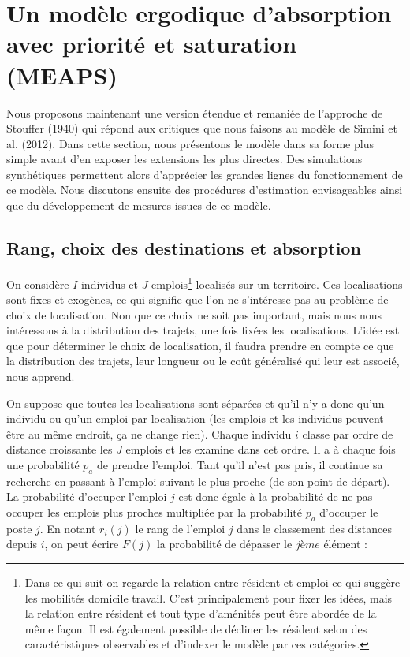 \documentclass[
  10pt,
  a4paper,
  numbers=noendperiod,
  DIV=9]{scrreprt}
\begin{document}
\hypertarget{sec-meaps}{%
\section{Un modèle ergodique d'absorption avec priorité et saturation
(MEAPS)}\label{sec-meaps}}

Nous proposons maintenant une version étendue et remaniée de l'approche
de Stouffer (1940) qui répond aux critiques que nous faisons au modèle
de Simini et al. (2012). Dans cette section, nous présentons le modèle
dans sa forme plus simple avant d'en exposer les extensions les plus
directes. Des simulations synthétiques permettent alors d'apprécier les
grandes lignes du fonctionnement de ce modèle. Nous discutons ensuite
des procédures d'estimation envisageables ainsi que du développement de
mesures issues de ce modèle.

\hypertarget{rang-choix-des-destinations-et-absorption}{%
\subsection{Rang, choix des destinations et
absorption}\label{rang-choix-des-destinations-et-absorption}}

On considère \(I\) individus et \(J\) emplois\footnote{Dans ce qui suit
  on regarde la relation entre résident et emploi ce qui suggère les
  mobilités domicile travail. C'est principalement pour fixer les idées,
  mais la relation entre résident et tout type d'aménités peut être
  abordée de la même façon. Il est également possible de décliner les
  résident selon des caractéristiques observables et d'indexer le modèle
  par ces catégories.} localisés sur un territoire. Ces localisations
sont fixes et exogènes, ce qui signifie que l'on ne s'intéresse pas au
problème de choix de localisation. Non que ce choix ne soit pas
important, mais nous nous intéressons à la distribution des trajets, une
fois fixées les localisations. L'idée est que pour déterminer le choix
de localisation, il faudra prendre en compte ce que la distribution des
trajets, leur longueur ou le coût généralisé qui leur est associé, nous
apprend.

On suppose que toutes les localisations sont séparées et qu'il n'y a
donc qu'un individu ou qu'un emploi par localisation (les emplois et les
individus peuvent être au même endroit, ça ne change rien). Chaque
individu \(i\) classe par ordre de distance croissante les \(J\) emplois
et les examine dans cet ordre. Il a à chaque fois une probabilité
\(p_a\) de prendre l'emploi. Tant qu'il n'est pas pris, il continue sa
recherche en passant à l'emploi suivant le plus proche (de son point de
départ). La probabilité d'occuper l'emploi \(j\) est donc égale à la
probabilité de ne pas occuper les emplois plus proches multipliée par la
probabilité \(p_a\) d'occuper le poste \(j\). En notant \(r_{i}(j)\) le
rang de l'emploi \(j\) dans le classement des distances depuis \(i\), on
peut écrire \(\bar F(j)\) la probabilité de dépasser le \(jème\) élément
:
\end{document}
